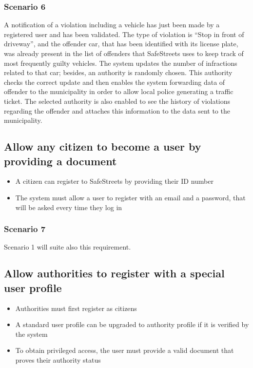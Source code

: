 \subsubsection{Scenario 6}
A notification of a violation including a vehicle has just been made by a registered user and has been validated. The type of violation is “Stop in front of driveway”, and the offender car, that has been identified with its license plate, was already present in the list of offenders that SafeStreets uses to keep track of most frequently guilty vehicles. The system updates the number of infractions related to that car; besides, an authority is randomly chosen. This authority checks the correct update and then enables the system forwarding data of offender to the municipality in order to allow local police generating a traffic ticket. The selected authority is also enabled to see the history of violations regarding the offender and attaches this information to the data sent to the municipality.

\subsection{Allow any citizen to become a user by providing a document}
\begin{itemize}
    \item A citizen can register to SafeStreets by providing their ID number
    \item The system must allow a user to register with an email and a password, that will be asked every time they log in
\end{itemize}
\subsubsection{Scenario 7}
Scenario 1 will suite also this requirement.

\subsection{Allow authorities to register with a special user profile}
\begin{itemize}
    \item Authorities must first register as citizens
    \item A standard user profile can be upgraded to authority profile if it is verified by the system
    \item To obtain privileged access, the user must provide a valid document that proves their authority status
\end{itemize}
